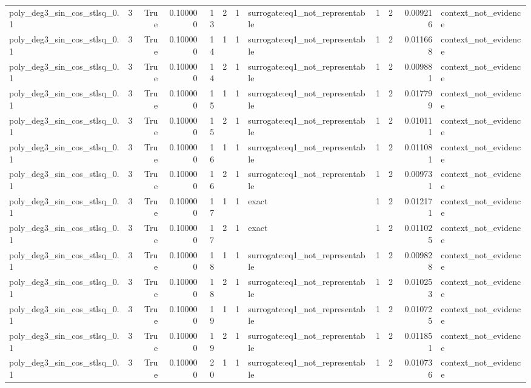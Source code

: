 \begin{tabular}{lrrrrrrlrrrl}
poly\_deg3\_sin\_cos\_stlsq\_0.1 & 3 & True & 0.100000 & 13 & 2 & 1 & surrogate:eq1\_not\_representable & 1 & 2 & 0.009216 & context\_not\_evidence \\
poly\_deg3\_sin\_cos\_stlsq\_0.1 & 3 & True & 0.100000 & 14 & 1 & 1 & surrogate:eq1\_not\_representable & 1 & 2 & 0.011668 & context\_not\_evidence \\
poly\_deg3\_sin\_cos\_stlsq\_0.1 & 3 & True & 0.100000 & 14 & 2 & 1 & surrogate:eq1\_not\_representable & 1 & 2 & 0.009881 & context\_not\_evidence \\
poly\_deg3\_sin\_cos\_stlsq\_0.1 & 3 & True & 0.100000 & 15 & 1 & 1 & surrogate:eq1\_not\_representable & 1 & 2 & 0.017799 & context\_not\_evidence \\
poly\_deg3\_sin\_cos\_stlsq\_0.1 & 3 & True & 0.100000 & 15 & 2 & 1 & surrogate:eq1\_not\_representable & 1 & 2 & 0.010111 & context\_not\_evidence \\
poly\_deg3\_sin\_cos\_stlsq\_0.1 & 3 & True & 0.100000 & 16 & 1 & 1 & surrogate:eq1\_not\_representable & 1 & 2 & 0.011081 & context\_not\_evidence \\
poly\_deg3\_sin\_cos\_stlsq\_0.1 & 3 & True & 0.100000 & 16 & 2 & 1 & surrogate:eq1\_not\_representable & 1 & 2 & 0.009731 & context\_not\_evidence \\
poly\_deg3\_sin\_cos\_stlsq\_0.1 & 3 & True & 0.100000 & 17 & 1 & 1 & exact & 1 & 2 & 0.012171 & context\_not\_evidence \\
poly\_deg3\_sin\_cos\_stlsq\_0.1 & 3 & True & 0.100000 & 17 & 2 & 1 & exact & 1 & 2 & 0.011025 & context\_not\_evidence \\
poly\_deg3\_sin\_cos\_stlsq\_0.1 & 3 & True & 0.100000 & 18 & 1 & 1 & surrogate:eq1\_not\_representable & 1 & 2 & 0.009828 & context\_not\_evidence \\
poly\_deg3\_sin\_cos\_stlsq\_0.1 & 3 & True & 0.100000 & 18 & 2 & 1 & surrogate:eq1\_not\_representable & 1 & 2 & 0.010253 & context\_not\_evidence \\
poly\_deg3\_sin\_cos\_stlsq\_0.1 & 3 & True & 0.100000 & 19 & 1 & 1 & surrogate:eq1\_not\_representable & 1 & 2 & 0.010725 & context\_not\_evidence \\
poly\_deg3\_sin\_cos\_stlsq\_0.1 & 3 & True & 0.100000 & 19 & 2 & 1 & surrogate:eq1\_not\_representable & 1 & 2 & 0.011851 & context\_not\_evidence \\
poly\_deg3\_sin\_cos\_stlsq\_0.1 & 3 & True & 0.100000 & 20 & 1 & 1 & surrogate:eq1\_not\_representable & 1 & 2 & 0.010736 & context\_not\_evidence \\

\end{tabular}
